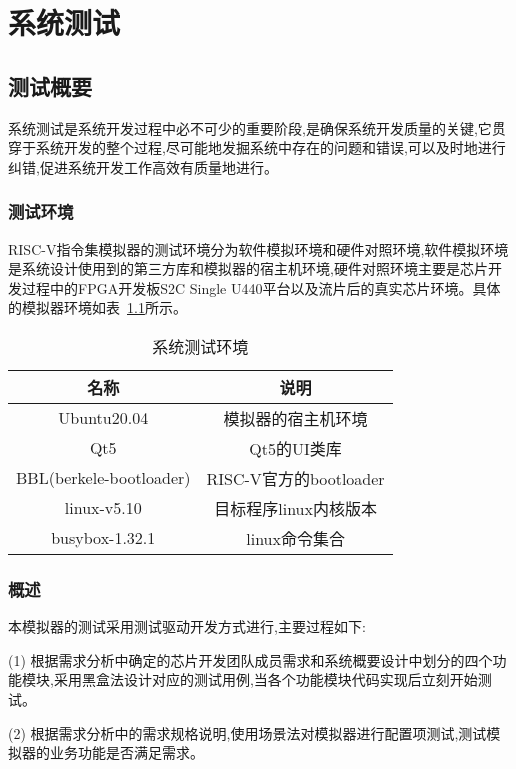 
\chapter{系统测试}

\section{测试概要}
系统测试是系统开发过程中必不可少的重要阶段,是确保系统开发质量的关键,它贯穿于系统开发的整个过程,尽可能地发掘系统中存在的问题和错误,可以及时地进行纠错,促进系统开发工作高效有质量地进行。

\subsection{测试环境}
RISC-V指令集模拟器的测试环境分为软件模拟环境和硬件对照环境,软件模拟环境是系统设计使用到的第三方库和模拟器的宿主机环境,硬件对照环境主要是芯片开发过程中的FPGA开发板S2C Single U440平台以及流片后的真实芯片环境。具体的模拟器环境如表~\ref{tab:env}所示。
\begin{table}[h]
    \centering
    \caption{系统测试环境}
    \label{tab:env}
    \begin{tabular}{cc}
      \toprule
      名称	& 说明\\
      \midrule
    Ubuntu20.04	& \multicolumn{1}{c}{模拟器的宿主机环境}\\
    Qt5	& \multicolumn{1}{c}{Qt5的UI类库}\\
    BBL(berkele-bootloader)	& \multicolumn{1}{c}{RISC-V官方的bootloader}\\
    linux-v5.10    & \multicolumn{1}{c}{目标程序linux内核版本}\\
    busybox-1.32.1 & \multicolumn{1}{c}{linux命令集合}\\
      \bottomrule
    \end{tabular}
\end{table}


\subsection{概述}
本模拟器的测试采用测试驱动开发方式进行,主要过程如下:


(1) 根据需求分析中确定的芯片开发团队成员需求和系统概要设计中划分的四个功能模块,采用黑盒法设计对应的测试用例,当各个功能模块代码实现后立刻开始测试。


(2) 根据需求分析中的需求规格说明,使用场景法对模拟器进行配置项测试,测试模拟器的业务功能是否满足需求。


